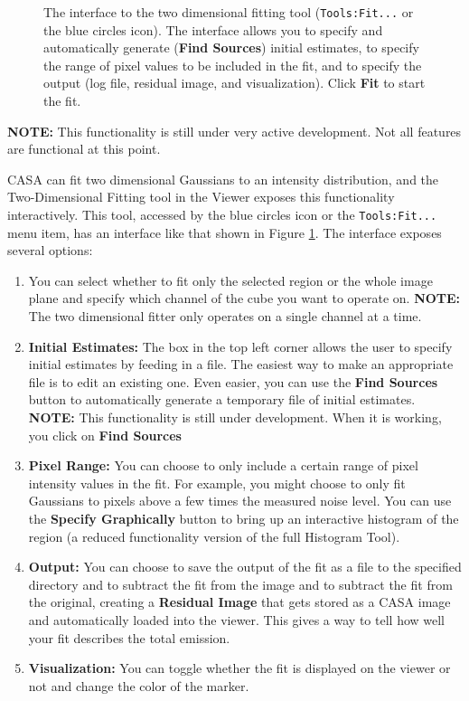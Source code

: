 \begin{figure}[h!]
\begin{center}
\caption{\label{fig:viewer_twodfit} The interface to the two dimensional fitting tool ({\tt Tools:Fit...} or the blue circles icon). 
The interface allows you to specify and automatically generate ({\bf Find Sources}) initial estimates, to specify the range of
pixel values to be included in the fit, and to specify the output (log file, residual image, and visualization). Click {\bf Fit} to 
start the fit.
}
\hrulefill
\end{center}
\end{figure}

{\bf NOTE:} This functionality is still under very active development. Not all features are functional at this point.

CASA can fit two dimensional Gaussians to an intensity distribution, and the Two-Dimensional Fitting tool in the Viewer exposes
this functionality interactively. This tool, accessed by the blue circles icon or the {\tt Tools:Fit...} menu item, has an interface
like that shown in Figure \ref{fig:viewer_twodfit}. The interface exposes several options:

\begin{enumerate}
\item You can select whether to fit only the selected region or the whole image plane and specify which channel of the cube you want to
operate on. {\bf NOTE:} The two dimensional fitter only operates on
a single channel at a time.
\item {\bf Initial Estimates:} The box in the top left corner allows the user to specify initial estimates by feeding in a file. The easiest way
to make an appropriate file is to edit an existing one. Even easier, you can use the {\bf Find Sources} button to automatically generate a
temporary file of initial estimates. {\bf NOTE:} This functionality is still under development. When it is working, you click on {\bf Find Sources}
\item {\bf Pixel Range:} You can choose to only include a certain range of pixel intensity values in the fit. For example, you might choose
to only fit Gaussians to pixels above a few times the measured noise level. You can use the {\bf Specify Graphically} button to bring up
an interactive histogram of the region (a reduced functionality version of the full Histogram Tool).
\item {\bf Output:} You can choose to save the output of the fit as a file to the specified directory and to subtract the fit from the image and
to subtract the fit from the original, creating a {\bf Residual Image} that gets stored as a CASA image and automatically loaded into the 
viewer. This gives a way to tell how well your fit describes the total emission.
\item {\bf Visualization:} You can toggle whether the fit is displayed on the viewer or not and change the color of the marker.
\end{enumerate}

